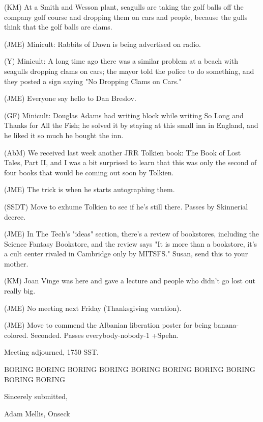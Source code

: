 \documentclass[12pt]{article}
\begin{document}
(KM) At a Smith and Wesson plant, seagulls are taking the golf balls off the company golf course and dropping them on cars and people, because the gulls think that the golf balls are clams.

(JME) Minicult: Rabbits of Dawn is being advertised on radio.

(Y) Minicult: A long time ago there was a similar problem at a beach with seagulls dropping clams on cars; the mayor told the police to do something, and they posted a sign saying "No Dropping Clams on Cars."

(JME) Everyone say hello to Dan Breslov.

(GF) Minicult: Douglas Adams had writing block while writing So Long and Thanks for All the Fish; he solved it by staying at this small inn in England, and he liked it so much he bought the inn.

(AbM) We received last week another JRR Tolkien book: The Book of Lost Tales, Part II, and I was a bit surprised to learn that this was only the second of four books that would be coming out soon by Tolkien.

(JME) The trick is when he starts autographing them.

(SSDT) Move to exhume Tolkien to see if he's still there. Passes by Skinnerial decree.

(JME) In The Tech's "ideas" section, there's a review of bookstores, including the Science Fantasy Bookstore, and the review says "It is more than a bookstore, it's a cult center rivaled in Cambridge only by MITSFS." Susan, send this to your mother.

(KM) Joan Vinge was here and gave a lecture and people who didn't go lost out really big.

(JME) No meeting next Friday (Thanksgiving vacation).

(JME) Move to commend the Albanian liberation poster for being banana-colored. Seconded. Passes everybody-nobody-1 +Spehn.

\vspace{12pt}

\noindent
Meeting adjourned, 1750 SST.

BORING BORING BORING BORING BORING BORING BORING BORING BORING BORING

\vspace{18pt}

\centerline{Sincerely submitted,}
\centerline{Adam Mellis, Onseck}
\end{document}
